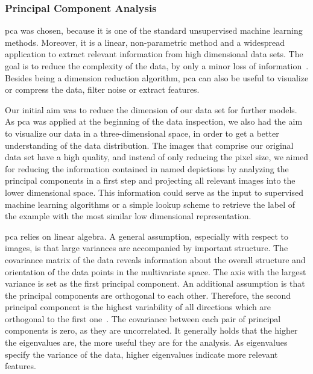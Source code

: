 \subsubsection{Principal Component Analysis}
\label{subsec:PCA}

\acrlong{pca} was chosen, because it is one of the standard unsupervised machine learning methods. Moreover, it is a linear, non-parametric method and a widespread application to extract relevant information from high dimensional data sets. The goal is to reduce the complexity of the data, by only a minor loss of information~\citep{shlens2014}. Besides being a dimension reduction algorithm, \acrshort{pca} can also be useful to visualize or compress the data, filter noise or extract features.

\bigskip
Our initial aim was to reduce the dimension of our data set for further models. As \acrshort{pca} was applied at the beginning of the data inspection, we also had the aim to visualize our data in a three-dimensional space, in order to get a better understanding of the data distribution. The images that comprise our original data set have a high quality, and instead of only reducing the pixel size, we aimed for reducing the information contained in named depictions by analyzing the principal components in a first step and projecting all relevant images into the lower dimensional space. This information could serve as the input to supervised machine learning algorithms or a simple lookup scheme to retrieve the label of the example with the most similar low dimensional representation.

\bigskip
\acrshort{pca} relies on linear algebra. A general assumption, especially with respect to images, is that large variances are accompanied by important structure. The covariance matrix of the data reveals information about the overall structure and orientation of the data points in the multivariate space. The axis with the largest variance is set as the first principal component. An additional assumption is that the principal components are orthogonal to each other. Therefore, the second principal component is the highest variability of all directions which are orthogonal to the first one~\citep{bohling2006}. The covariance between each pair of principal components is zero, as they are uncorrelated. It generally holds that the higher the eigenvalues are, the more useful they are for the analysis. As eigenvalues specify the variance of the data, higher eigenvalues indicate more relevant features.

